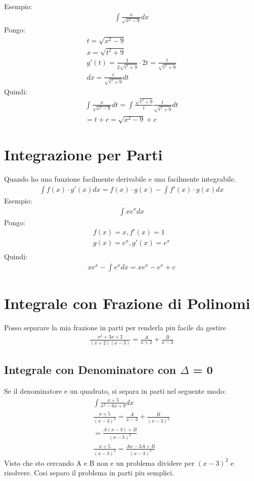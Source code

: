 \documentclass{article}
\begin{document}
Esempio:
\begin{gather*}
		\int \frac{x}{\sqrt{x^2 - 9}}dx
\end{gather*}
Pongo:
\begin{gather*}
		t=\sqrt{x^2 - 9}\\
		x = \sqrt{t^2 + 9}\\
		g'(t) = \frac{1}{2\sqrt{t^2 + 9}}\cdot 2t =\frac{t}{\sqrt{t^2+9}}\\
		dx=\frac{t}{\sqrt{t^2+9}}dt
\end{gather*}
Quindi:
\begin{gather*}
		\int \frac{x}{\sqrt{x^2-9}}dt=\int \frac{\sqrt{t^2+9}}{t}\frac{t}{\sqrt{t^2+9}}dt\\
		= t +c =\sqrt{x^2-9}+c
\end{gather*}
\section{Integrazione per Parti}
Quando ho una funzione facilmente derivabile e una facilmente integrabile.
\begin{gather*}
		\int f(x)\cdot g'(x)dx = f(x)\cdot g(x) - \int f'(x)\cdot g(x)dx
\end{gather*}
Esempio:
\begin{gather*}
		\int xe^x dx		
\end{gather*}
Pongo:
\begin{gather*}
		f(x) = x, f'(x) = 1\\
		g(x) = e^x, g'(x) = e^x\\
\end{gather*}
Quindi:
\begin{gather*}
		xe^x - \int e^x dx = xe^x - e^x + c
\end{gather*}
\section{Integrale con Frazione di Polinomi}
Posso separare la mia frazione in parti per renderla piu facile da gestire
\begin{gather*}
		\frac{x^2+3x+2}{(x+2)(x-3)}=\frac{A}{x+2}+\frac{B}{x-3}
\end{gather*}

\subsection{Integrale con Denominatore con $\Delta$ = 0}
Se il denominatore e un quadrato, si separa in parti nel seguente modo:
\begin{gather*}
		\int \frac{x + 5}{x^2-6x+9}dx\\
		\frac{x+5}{(x-3)^2} = \frac{A}{x-3}+\frac{B}{(x-3)^2}\\
	=\frac{A(x-3)+B}{(x-3)^2}\\
	\frac{x+5}{(x-3)^2}=\frac{Ax-3A+B}{(x-3)^2}
\end{gather*}
Visto che sto cercando A e B non e un problema dividere per $(x-3)^2$ e risolvere. Cosi separo il problema in parti piu semplici.
\end{document}
